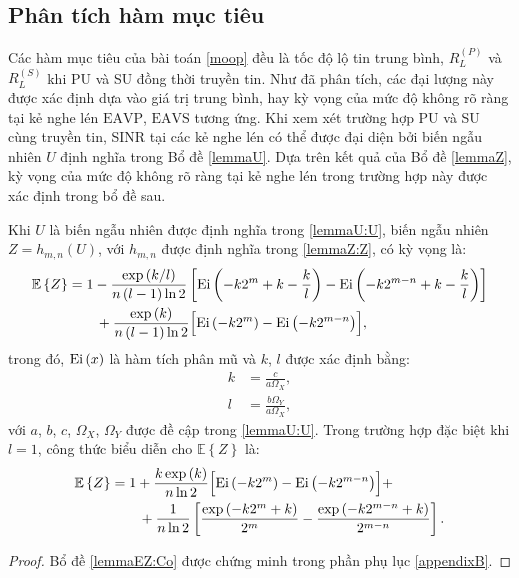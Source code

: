 \documentclass[../main.tex]{subfiles}
\begin{document}
\subsection{Phân tích hàm mục tiêu}

Các hàm mục tiêu của bài toán \eqref{moop} đều là tốc độ lộ tin trung bình, $R_L^{(P)}$ và $R_L^{(S)}$ khi PU và SU đồng thời truyền tin. Như đã phân tích, các đại lượng này được xác định dựa vào giá trị trung bình, hay kỳ vọng của mức độ không rõ ràng tại kẻ nghe lén $\text{EAVP}$, $\text{EAVS}$ tương ứng. Khi xem xét trường hợp PU và SU cùng truyền tin, SINR tại các kẻ nghe lén có thể được đại diện bởi biến ngẫu nhiên $U$ định nghĩa trong Bổ đề \ref{lemmaU}. Dựa trên kết quả của Bổ đề \ref{lemmaZ}, kỳ vọng của mức độ không rõ ràng tại kẻ nghe lén trong trường hợp này được xác định trong bổ đề sau.

\begin{lemma}\label{lemmaEZ:Co}
Khi $U$ là biến ngẫu nhiên được định nghĩa trong \eqref{lemmaU:U}, biến ngẫu nhiên $Z = h_{m, n}\left(U\right)$, với $h_{m, n}$ được định nghĩa trong \eqref{lemmaZ:Z}, có kỳ vọng là:
\begin{equation}\label{lemmaEZ:EZCo}
\begin{aligned}
    \mathbb{E}\left\{Z\right\} 
    &= 1 - \frac{\exp\left(k/l\right)}{n\left(l-1\right)\ln{2}}\left[\textnormal{Ei}\left(-k2^m+k-\frac{k}{l}\right)-\textnormal{Ei}\left(-k2^{m-n}+k-\frac{k}{l}\right)\right] \\ 
    & \qquad + \frac{\exp\left(k\right)}{n\left(l-1\right)\ln{2}}\Bigl[\textnormal{Ei}\left(-k2^m\right)-\textnormal{Ei}\left(-k2^{m-n}\right)\Bigr],
\end{aligned}
\end{equation}
trong đó, $\textnormal{Ei}\left(x\right)$ là hàm tích phân mũ và $k$, $l$ được xác định bằng:
\begin{equation}\label{lemmaEZ:klCo}
\begin{aligned}
    k &= \frac{c}{a\Omega_X}, \\
    l &= \frac{b\Omega_Y}{a\Omega_X},
\end{aligned}
\end{equation}
với $a$, $b$, $c$, $\Omega_X$, $\Omega_Y$ được đề cập trong \eqref{lemmaU:U}.
Trong trường hợp đặc biệt khi $l=1$, công thức biểu diễn cho $\mathbb{E}\left\{Z\right\}$ là:
\begin{equation}\label{lemmaEZ:EZCo:l1}
\begin{aligned}
    \mathbb{E}\left\{Z\right\} 
    &= 1 + \frac{k\exp\left(k\right)}{n\ln{2}}
       \Bigl[
            \textnormal{Ei}\left(-k{2^{m}}\right) - 
            \textnormal{Ei}\left(-k{2^{m-n}}\right)
       \Bigr] + \\
       & \qquad + \frac{1}{n\ln{2}}
        \left[ 
            \frac{\exp\left(-k2^m+k\right)}{2^m} -
            \frac{\exp\left(-k2^{m-n}+k\right)}{2^{m-n}}
        \right] .
\end{aligned}
\end{equation}

\end{lemma}
\begin{proof}
Bổ đề \ref{lemmaEZ:Co} được chứng minh trong phần phụ lục \ref{appendixB}.
\end{proof}
\end{document}
